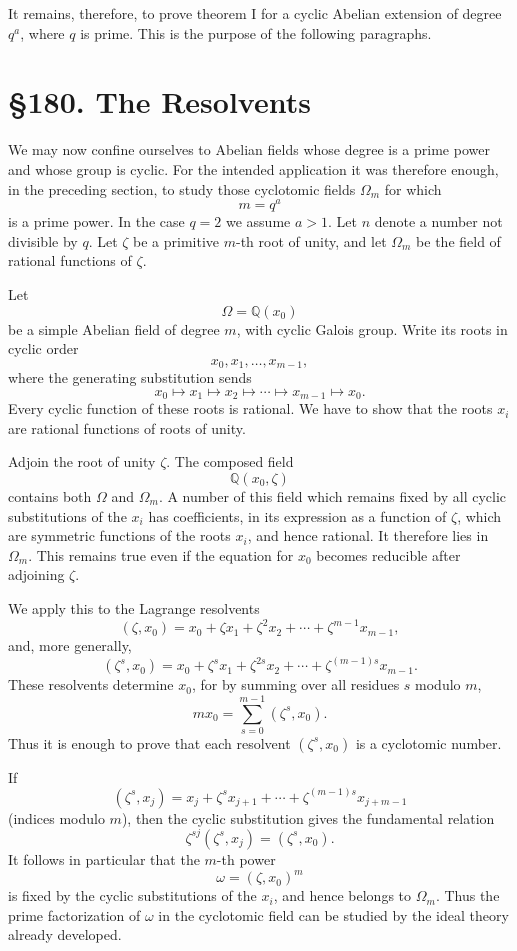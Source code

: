\documentclass[11pt,a4paper]{book}
\newcommand{\webersection}[2]{\clearpage\section*{\S #1. #2}}
\newcommand{\zetaS}{\zeta}
\providecommand{\Om}{\Omega_m}
\begin{document}
It remains, therefore, to prove theorem I for a cyclic Abelian extension of degree \(q^a\), where \(q\) is prime.  This is the purpose of the following paragraphs.

\webersection{180}{The Resolvents}

We may now confine ourselves to Abelian fields whose degree is a prime power and whose group is cyclic.  For the intended application it was therefore enough, in the preceding section, to study those cyclotomic fields \(\Om\) for which
\[
  m=q^a
\tag{1}
\]
is a prime power.  In the case \(q=2\) we assume \(a>1\).  Let \(n\) denote a number not divisible by \(q\).  Let \(\zetaS\) be a primitive \(m\)-th root of unity, and let \(\Om\) be the field of rational functions of \(\zetaS\).

Let
\[
  \Omega=\mathbb Q(x_0)
\]
be a simple Abelian field of degree \(m\), with cyclic Galois group.  Write its roots in cyclic order
\[
  x_0,x_1,\ldots,x_{m-1},
\]
where the generating substitution sends
\[
  x_0\mapsto x_1\mapsto x_2\mapsto\cdots\mapsto x_{m-1}\mapsto x_0.
\tag{2}
\]
Every cyclic function of these roots is rational.  We have to show that the roots \(x_i\) are rational functions of roots of unity.

Adjoin the root of unity \(\zetaS\).  The composed field
\[
  \mathbb Q(x_0,\zetaS)
\]
contains both \(\Omega\) and \(\Om\).  A number of this field which remains fixed by all cyclic substitutions of the \(x_i\) has coefficients, in its expression as a function of \(\zetaS\), which are symmetric functions of the roots \(x_i\), and hence rational.  It therefore lies in \(\Om\).  This remains true even if the equation for \(x_0\) becomes reducible after adjoining \(\zetaS\).

We apply this to the Lagrange resolvents
\[
  (\zetaS,x_0)=x_0+\zetaS x_1+\zetaS^2x_2+\cdots+\zetaS^{m-1}x_{m-1},
\tag{3}
\]
and, more generally,
\[
  (\zetaS^s,x_0)=x_0+\zetaS^s x_1+\zetaS^{2s}x_2+\cdots+\zetaS^{(m-1)s}x_{m-1}.
\tag{4}
\]
These resolvents determine \(x_0\), for by summing over all residues \(s\) modulo \(m\),
\[
  m x_0=\sum_{s=0}^{m-1}(\zetaS^s,x_0).
\tag{5}
\]
Thus it is enough to prove that each resolvent \((\zetaS^s,x_0)\) is a cyclotomic number.

If
\[
  (\zetaS^s,x_j)=x_j+\zetaS^s x_{j+1}+\cdots+\zetaS^{(m-1)s}x_{j+m-1}
\]
(indices modulo \(m\)), then the cyclic substitution gives the fundamental relation
\[
  \zetaS^{sj}(\zetaS^s,x_j)=(\zetaS^s,x_0).
\tag{6}
\]
It follows in particular that the \(m\)-th power
\[
  \omega=(\zetaS,x_0)^m
\tag{7}
\]
is fixed by the cyclic substitutions of the \(x_i\), and hence belongs to \(\Om\).  Thus the prime factorization of \(\omega\) in the cyclotomic field can be studied by the ideal theory already developed.
\end{document}
